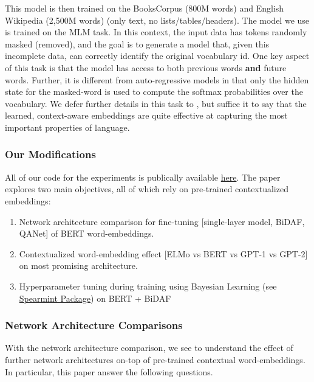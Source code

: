 \documentclass{article}
\begin{document}
This model is then trained on the BooksCorpus (800M words) and English Wikipedia (2,500M words) (only text, no lists/tables/headers). The model we use is trained on the MLM task. In this context, the input data has tokens randomly masked (removed), and the goal is to generate a model that, given this incomplete data, can correctly identify the original vocabulary id. One key aspect of this task is that the model has access to both previous words \textbf{and} future words. Further, it is different from auto-regressive models in that only the hidden state for the masked-word is used to compute the softmax probabilities over the vocabulary. We defer further details in this task to \cite{BERT}, but suffice it to say that the learned, context-aware embeddings are quite effective at capturing the most important properties of language.

\subsubsection{Our Modifications}
All of our code for the experiments is publically available \href{https://github.com/kandluis/cs224n}{here}. The paper explores two main objectives, all of which rely on pre-trained contextualized embeddings:

\begin{enumerate}
  \item Network architecture comparison for fine-tuning [single-layer model, BiDAF, QANet] of BERT word-embeddings.
  \item Contextualized word-embedding effect [ELMo vs BERT vs GPT-1 vs GPT-2] on most promising architecture.
  \item Hyperparameter tuning during training using Bayesian Learning (see \href{https://github.com/HIPS/Spearmint}{Spearmint Package}) on BERT + BiDAF
\end{enumerate}

\subsubsection{Network Architecture Comparisons}
With the network architecture comparison, we see to understand the effect of further network architectures on-top of pre-trained contextual word-embeddings. In particular, this paper answer the following questions.
\end{document}
